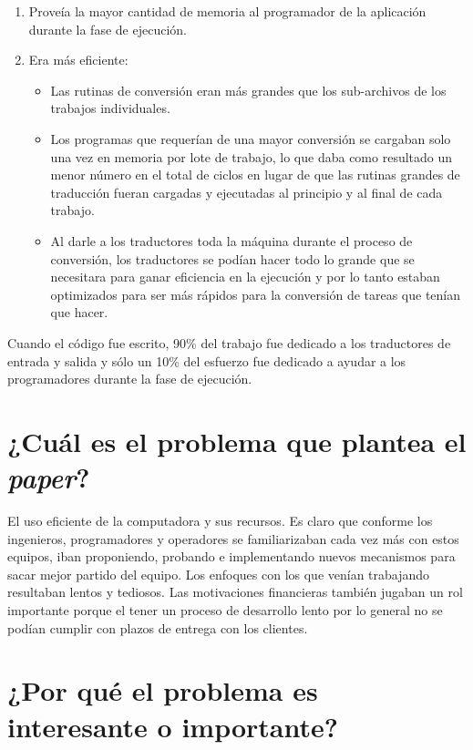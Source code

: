 \begin{enumerate}
    \item Proveía la mayor cantidad de memoria al programador de la aplicación durante la fase de ejecución.
    \item Era más eficiente:
    \begin{itemize}
        \item Las rutinas de conversión eran más grandes que los sub-archivos de los trabajos individuales.
        \item Los programas que requerían de una mayor conversión se cargaban solo una vez en memoria por lote de trabajo, lo que daba como resultado un menor número en el total de ciclos en lugar de  que las rutinas grandes de traducción fueran cargadas y ejecutadas al principio y al final de cada trabajo.
        \item Al darle a los traductores toda la máquina durante el proceso de conversión, los traductores se podían hacer todo lo grande que se necesitara para ganar eficiencia en la ejecución y por lo tanto estaban optimizados para ser más rápidos para la conversión de tareas que tenían que hacer.
    \end{itemize}
    
\end {enumerate}

Cuando el código fue escrito, 90\% del trabajo fue dedicado a los traductores de entrada y salida y sólo un 10\% del esfuerzo fue dedicado a ayudar a los programadores durante la fase de ejecución.


\section{¿Cuál es el problema que plantea el \textit{paper}?}

El uso eficiente de la computadora y sus recursos. Es claro que conforme los ingenieros, programadores y operadores se familiarizaban cada vez más con estos equipos, iban proponiendo, probando e implementando nuevos mecanismos para sacar mejor partido del equipo. Los enfoques con los que venían trabajando resultaban lentos y tediosos. Las motivaciones financieras también jugaban un rol importante porque el tener un proceso de desarrollo lento por lo general no se podían cumplir con plazos de entrega con los clientes.

\section{¿Por qué el problema es interesante o importante?}

